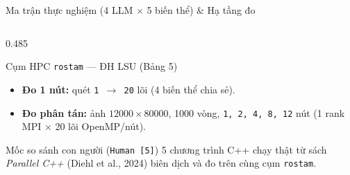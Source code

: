 \documentclass[aspectratio=169,10pt]{beamer}
\newcommand{\code}[1]{\texttt{\color{BlueDark}#1}}
\begin{document}
\begin{frame}{Ma trận thực nghiệm (4 LLM $\times$ 5 biến thể) \& Hạ tầng đo}
\begin{columns}[T,totalwidth=\textwidth]
\begin{column}{0.485\textwidth}
\begin{bluebox}[height=3.65cm]{Cụm HPC \texttt{rostam} --- ĐH LSU (Bảng 5)}
\begin{itemize}
        \item \textbf{Đo 1 nút:} quét \code{1 $\to$ 20} lõi (4 biến thể chia sẻ).
        \item \textbf{Đo phân tán:} ảnh $12000\times 80000$, 1000 vòng, \code{1, 2, 4, 8, 12} nút (1 rank MPI $\times$ 20 lõi OpenMP/nút).
      \end{itemize}
    \end{bluebox}
    \vspace{0.22cm}
    \begin{hboxcard}[height=1.72cm]{Mốc so sánh con người (\texttt{Human [5]})}
      \scriptsize 5 chương trình C++ chạy thật từ sách \emph{Parallel C++} (Diehl et al., 2024) biên dịch và đo trên cùng cụm \code{rostam}.
    \end{hboxcard}
  \end{column}
\end{columns}
\end{frame}
\end{document}
